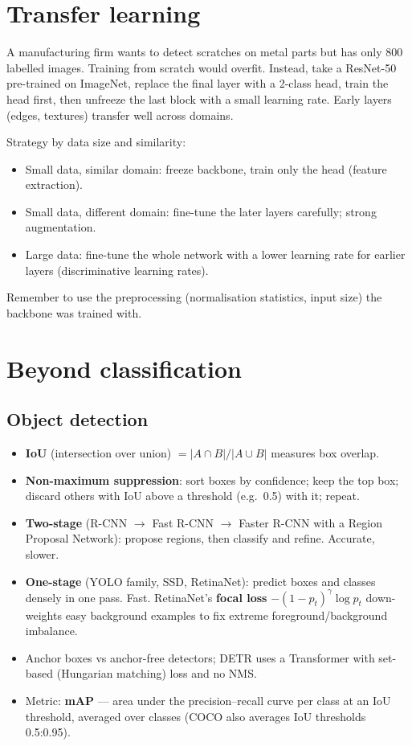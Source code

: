 \section{Transfer learning}
\begin{realworld}
A manufacturing firm wants to detect scratches on metal parts but has only 800 labelled images. Training from scratch would overfit. Instead, take a ResNet-50 pre-trained on ImageNet, replace the final layer with a 2-class head, train the head first, then unfreeze the last block with a small learning rate. Early layers (edges, textures) transfer well across domains.
\end{realworld}
Strategy by data size and similarity:
\begin{itemize}
  \item Small data, similar domain: freeze backbone, train only the head (feature extraction).
  \item Small data, different domain: fine-tune the later layers carefully; strong augmentation.
  \item Large data: fine-tune the whole network with a lower learning rate for earlier layers (discriminative learning rates).
\end{itemize}
Remember to use the preprocessing (normalisation statistics, input size) the backbone was trained with.

\section{Beyond classification}
\subsection{Object detection}
\begin{itemize}
  \item \textbf{IoU} (intersection over union) $=|A\cap B|/|A\cup B|$ measures box overlap.
  \item \textbf{Non-maximum suppression}: sort boxes by confidence; keep the top box; discard others with IoU above a threshold (e.g.\ 0.5) with it; repeat.
  \item \textbf{Two-stage} (R-CNN $\to$ Fast R-CNN $\to$ Faster R-CNN with a Region Proposal Network): propose regions, then classify and refine. Accurate, slower.
  \item \textbf{One-stage} (YOLO family, SSD, RetinaNet): predict boxes and classes densely in one pass. Fast. RetinaNet's \textbf{focal loss} $-(1-p_t)^\gamma\log p_t$ down-weights easy background examples to fix extreme foreground/background imbalance.
  \item Anchor boxes vs anchor-free detectors; DETR uses a Transformer with set-based (Hungarian matching) loss and no NMS.
  \item Metric: \textbf{mAP} --- area under the precision--recall curve per class at an IoU threshold, averaged over classes (COCO also averages IoU thresholds 0.5:0.95).
\end{itemize}
